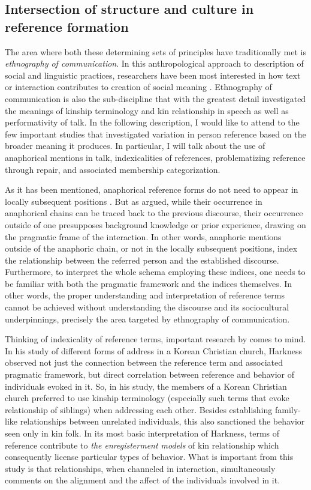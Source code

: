 \documentclass[12pt]{article}
\begin{document}
\subsection{Intersection of structure and culture in reference formation}
The area where both these determining sets of principles have traditionally met is \textit{ethnography of communication}. In this anthropological approach to description of social and linguistic practices, researchers have been most interested in how text or interaction contributes to creation of social meaning \parencite{hymes1989}. Ethnography of communication is also the sub-discipline that with the greatest detail investigated the meanings of kinship terminology and kin relationship in speech as well as performativity of talk. In the following description, I would like to attend to the few important studies that investigated variation in person reference based on the broader meaning it produces. In particular, I will talk about the use of anaphorical mentions in talk, indexicalities of references, problematizing reference through repair, and associated membership categorization. 

As it has been mentioned, anaphorical reference forms do not need to appear in locally subsequent positions \parencite{schegloff1996b}. But as \textcite{hanks2007} argued, while their occurrence in anaphorical chains can be traced back to the previous discourse, their occurrence outside of one presupposes background knowledge or prior experience, drawing on the pragmatic frame of the interaction. In other words, anaphoric mentions outside of the anaphoric chain, or not in the locally subsequent positions, index the relationship between the referred person and the established discourse. Furthermore, to interpret the whole schema employing these indices, one needs to be familiar with both the pragmatic framework and the indices themselves. In other words, the proper understanding and interpretation of reference terms cannot be achieved without understanding the discourse and its sociocultural underpinnings, precisely the area targeted by ethnography of communication.

Thinking of indexicality of reference terms,  important research by \textcite{harkness2015} comes to mind. In his study of different forms of address in a Korean Christian church, Harkness observed not just the connection between the reference term and associated pragmatic framework, but direct correlation between reference and behavior of individuals evoked in it. So, in his study, the members of a Korean Christian church preferred to use kinship terminology (especially such terms that evoke relationship of siblings) when addressing each other. Besides establishing family-like relationships between unrelated individuals, this also sanctioned the behavior seen only in kin folk. In its most basic interpretation of Harkness, terms of reference contribute to \textit{the enregisterment models} of kin relationship which consequently license particular types of behavior. What is important from this study is that relationships, when channeled in interaction, simultaneously comments on the alignment and the affect of the individuals involved in it. 
\end{document}
